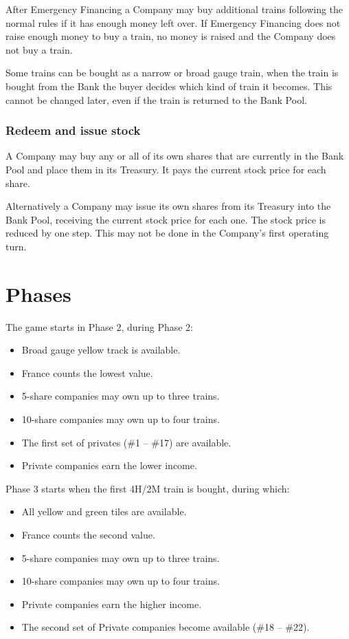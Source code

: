 \documentclass[a4paper,twocolumn]{article}
\begin{document}
After Emergency Financing a Company may buy additional trains following the
normal rules if it has enough money left over. If Emergency Financing does not
raise enough money to buy a train, no money is raised and the Company does not
buy a train.

Some trains can be bought as a narrow or broad gauge train, when the train is
bought from the Bank the buyer decides which kind of train it becomes. This
cannot be changed later, even if the train is returned to the Bank Pool.

\subsubsection{Redeem and issue stock}
A Company may buy any or all of its own shares that are currently in the Bank
Pool and place them in its Treasury. It pays the current stock price for each
share.

Alternatively a Company may issue its own shares from its Treasury into the Bank
Pool, receiving the current stock price for each one. The stock price is
reduced by one step. This may not be done in the Company's first operating turn.

\section{Phases}
The game starts in Phase 2, during Phase 2:
\begin{itemize}
	\item Broad gauge yellow track is available.
	\item France counts the lowest value.
	\item 5-share companies may own up to three trains.
	\item 10-share companies may own  up to four trains.
	\item The first set of privates (\#1 -- \#17) are available.
	\item Private companies earn the lower income.
\end{itemize}

Phase 3 starts when the first 4H/2M train is bought, during which:
\begin{itemize}
	\item All yellow and green tiles are available.
	\item France counts the second value.
	\item 5-share companies may own up to three trains.
	\item 10-share companies may own  up to four trains.
	\item Private companies earn the higher income.
	\item The second set of Private companies become available (\#18 -- \#22).
\end{itemize}
\end{document}
